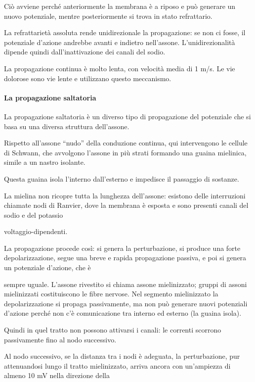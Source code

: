 \documentclass[12pt,a4paper]{book}
\begin{document}
Ciò avviene perché anteriormente la membrana è a riposo e può generare un nuovo potenziale, mentre posteriormente si trova in stato refrattario.

La refrattarietà assoluta rende unidirezionale la propagazione: se non ci fosse, il potenziale d'azione andrebbe avanti e indietro nell'assone. L'unidirezionalità dipende quindi dall'inattivazione dei canali del sodio.

La propagazione continua è molto lenta, con velocità media di 1 m/s. Le vie dolorose sono vie lente e utilizzano questo meccanismo.


\paragraph{La propagazione saltatoria}

La propagazione saltatoria è un diverso tipo di propagazione del potenziale che si basa su una diversa struttura dell'assone.

Rispetto all'assone ``nudo'' della conduzione continua, qui intervengono le cellule di Schwann, che avvolgono l'assone in più strati formando una guaina mielinica, simile a un nastro isolante.

Questa guaina isola l'interno dall'esterno e impedisce il passaggio di sostanze.

La mielina non ricopre tutta la lunghezza dell'assone: esistono delle interruzioni chiamate nodi di Ranvier, dove la membrana è esposta e sono presenti canali del sodio e del potassio

voltaggio-dipendenti.

La propagazione procede così: si genera la perturbazione, si produce una forte depolarizzazione, segue una breve e rapida propagazione passiva, e poi si genera un potenziale d'azione, che è

sempre uguale. L'assone rivestito si chiama assone mielinizzato; gruppi di assoni mielinizzati costituiscono le fibre nervose. Nel segmento mielinizzato la depolarizzazione si propaga passivamente, ma non può generare nuovi potenziali d'azione perché non c'è comunicazione tra interno ed esterno (la guaina isola).

Quindi in quel tratto non possono attivarsi i canali: le correnti scorrono passivamente fino al nodo successivo.

Al nodo successivo, se la distanza tra i nodi è adeguata, la perturbazione, pur attenuandosi lungo il tratto mielinizzato, arriva ancora con un'ampiezza di almeno 10 mV nella direzione della
\end{document}
